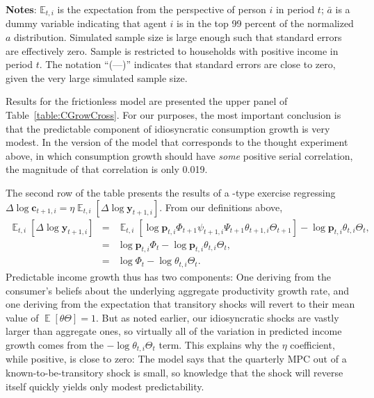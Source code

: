 \documentclass[titlepage]{article}
\DeclareMathOperator{\Ex}{\mathbb{E}} %
\newlength\TableWidth
\begin{document}
\begin{minipage}{\TableWidth}
\begin{table}
\begin{flushleft}
  \footnotesize \textbf{Notes}: $\mathbb{E}_{t,i}$ is the expectation from the perspective of person $i$ in period $t$; $\bar{a}$ is a dummy variable indicating that agent $i$ is in the top 99 percent of the normalized $a$ distribution.  Simulated sample size is large enough such that standard errors are effectively zero.  Sample is restricted to households with positive income in period $t$. The notation ``(---)'' indicates that standard errors are close to zero, given the very large simulated sample size.\normalsize
\end{flushleft}

\medskip\medskip
\end{table}
\end{minipage}
 Results for the frictionless model are presented the upper panel of Table~\ref{table:CGrowCross}.
For our purposes, the most important conclusion is that the predictable component of idiosyncratic consumption growth is very modest.  In the version of the model that corresponds to the thought experiment above, in which consumption growth should have {\it some} positive serial correlation, the magnitude of that correlation is only 0.019. 

The second row of the table presents the results of a \cite{cmModel}-type exercise regressing $\Delta \log \mathbf{c}_{t+1,i} = \eta \Ex_{t,i}[\Delta \log \mathbf{y}_{t+1,i}]$.  From our definitions above,
\begin{eqnarray*}
  \Ex_{t,i}[\Delta \log \mathbf{y}_{t+1,i}] & = & \Ex_{t,i}[\log \mathbf{p}_{t,i}\Phi_{t+1}\psi_{t+1,i}\Psi_{t+1}\theta_{t+1,i}\Theta_{t+1}] - \log \mathbf{p}_{t,i}\theta_{t,i}\Theta_{t},
  \\ & = & \log \mathbf{p}_{t,i}\Phi_{t} - \log \mathbf{p}_{t,i}\theta_{t,i}\Theta_{t},
   \\ & = & \log \Phi_{t} - \log \theta_{t,i}\Theta_{t}.
\end{eqnarray*}
Predictable income growth thus has two components: One deriving from the consumer's beliefs about the underlying aggregate productivity growth rate, and one deriving from the expectation that transitory shocks will revert to their mean value of $\Ex[\theta \Theta]=1$.  But as noted earlier, our idiosyncratic shocks are vastly larger than aggregate ones, so virtually all of the variation in predicted income growth comes from the $-\log \theta_{t,i}\Theta_{t}$ term.  This explains why the $\eta$ coefficient, while positive, is close to zero: The model says that the quarterly MPC out of a known-to-be-transitory shock is small, so knowledge that the shock will reverse itself quickly yields only modest predictability.
\end{document}
